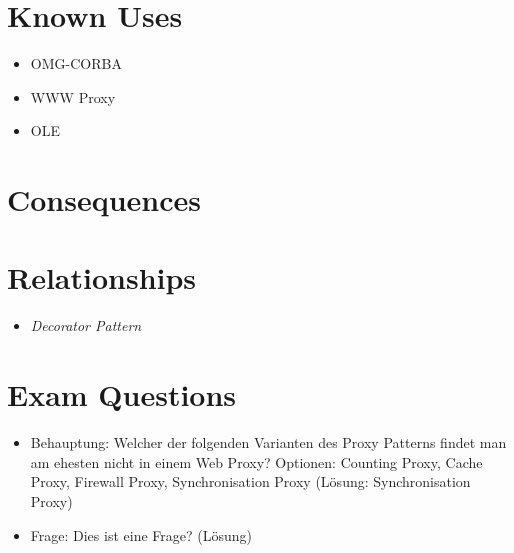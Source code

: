 \section{Known Uses}
\begin{itemize}
	\item OMG-CORBA
	\item WWW Proxy
	\item OLE 
\end{itemize}

\section{Consequences}
\begin{itemize}
\end{itemize}

\section{Relationships}
\begin{itemize}
	\item \textit{Decorator Pattern}
\end{itemize}

\section{Exam Questions}
\begin{itemize}
  	\item Behauptung: Welcher der folgenden Varianten des Proxy Patterns findet man am ehesten nicht in einem Web Proxy? Optionen: Counting Proxy, Cache Proxy, Firewall Proxy, Synchronisation Proxy (Lösung: Synchronisation Proxy)
    \item Frage: Dies ist eine Frage? (Lösung)
\end{itemize}
